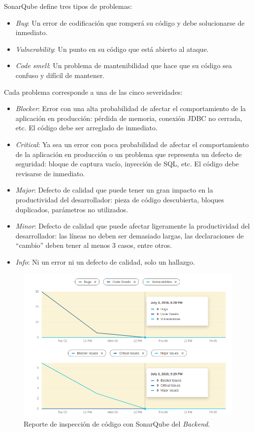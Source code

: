 SonarQube define tres tipos de problemas:

\begin{itemize}
    \item \textit{Bug}: Un error de codificación que romperá su código y debe solucionarse de inmediato.
    \item \textit{Vulnerability}: Un punto en su código que está abierto al ataque.
    \item \textit{Code smell}: Un problema de mantenibilidad que hace que su código sea confuso y difícil de mantener.
\end{itemize}

Cada problema corresponde a una de las cinco severidades:

\begin{itemize}
    \item \textit{Blocker}: Error con una alta probabilidad de afectar el comportamiento de la aplicación en producción: pérdida de memoria, conexión JDBC no cerrada, etc. El código debe ser arreglado de inmediato.
    \item \textit{Critical}: Ya sea un error con poca probabilidad de afectar el comportamiento de la aplicación en producción o un problema que representa un defecto de seguridad: bloque de captura vacío, inyección de SQL, etc. El código debe revisarse de inmediato.
    \item \textit{Major}: Defecto de calidad que puede tener un gran impacto en la productividad del desarrollador: pieza de código descubierta, bloques duplicados, parámetros no utilizados.
    \item \textit{Minor}: Defecto de calidad que puede afectar ligeramente la productividad del desarrollador: las líneas no deben ser demasiado largas, las declaraciones de ``cambio'' deben tener al menos 3 casos, entre otros.
    \item \textit{Info}: Ni un error ni un defecto de calidad, solo un hallazgo.
\end{itemize}

\begin{figure}[H]
    \centering
    \includegraphics[width=\textwidth]{reporteQA_BE.png}
    \caption{Reporte de inspección de código con SonarQube del \textit{Backend}.}
    \label{fig:QAbackend}
\end{figure}

